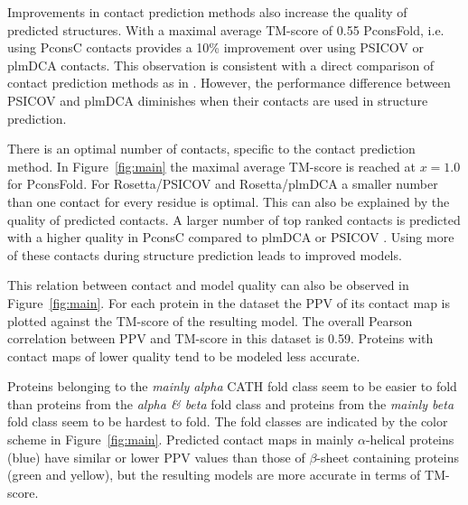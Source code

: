 \documentclass{bioinfo}
\begin{document}
Improvements in contact prediction methods also increase the quality
of predicted structures. With a maximal average TM-score of 0.55
PconsFold, i.e. using PconsC contacts provides a 10\% improvement
over using PSICOV or plmDCA contacts. This observation is consistent
with a direct comparison of contact prediction methods as in
\citeauthor{skwark_PconsC:_2013}
\citeyear{skwark_PconsC:_2013}. However, the performance difference
between PSICOV and plmDCA diminishes when their contacts are used in
structure prediction. 


There is an optimal number of contacts, specific to the contact
prediction method. In Figure~\ref{fig:main}  the maximal average
TM-score is reached at $x=1.0$ for PconsFold. For Rosetta/PSICOV and
Rosetta/plmDCA a smaller number than one contact for every residue 
is optimal. This can also be explained by the quality of
predicted contacts. A larger number of top ranked contacts is
predicted with a higher quality in PconsC compared to plmDCA or PSICOV
\cite[]{skwark_PconsC:_2013}. Using more of these contacts during
structure prediction leads to improved models. 


This relation between contact and model quality can also be observed
in Figure~\ref{fig:main}. For each protein in the dataset the PPV
of its contact map is plotted against the TM-score of the resulting
model. The overall Pearson correlation between PPV and TM-score in
this dataset is 0.59. Proteins with contact maps of lower quality tend
to be modeled less accurate. 


Proteins belonging to the {\it
  mainly alpha} CATH fold class seem to be easier to fold than
proteins from the {\it alpha \& beta} fold class and proteins from the
{\it mainly beta} fold class seem to be hardest to fold. The fold
classes are indicated by the color scheme in Figure~\ref{fig:main}. Predicted contact maps in mainly $\alpha$-helical proteins (blue)
have similar or lower PPV values than those of $\beta$-sheet
containing proteins (green and yellow), but the resulting models are
more accurate in terms of TM-score.
\end{document}
